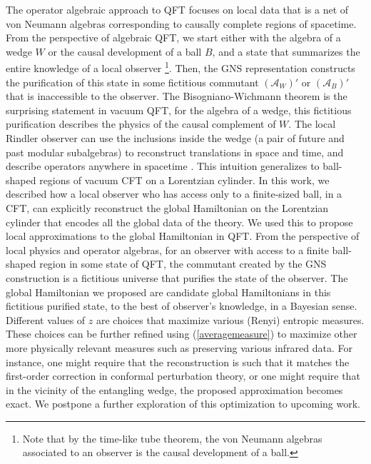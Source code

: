 \documentclass[a4paper,11pt]{article}
\theoremstyle{definition}
\newcommand{\mA}{\mathcal{A}}
\begin{document}
The operator algebraic approach to QFT focuses on local data that is a net of von Neumann algebras corresponding to causally complete regions of spacetime. From the perspective of algebraic QFT, we start either with the algebra of a wedge $W$ or the causal development of a ball $B$, and a state that summarizes the entire knowledge of a local observer \footnote{Note that by the time-like tube theorem, the von Neumann algebras associated to an observer is the causal development of a ball.}. Then, the GNS representation constructs the purification of this state in some fictitious commutant $(\mA_W)'$ or $(\mA_B)'$ that is inaccessible to the observer. The Bisogniano-Wichmann theorem is the surprising statement in vacuum QFT, for the algebra of a wedge, this fictitious purification describes the physics of the causal complement of $W$. The local Rindler observer can use the inclusions inside the wedge (a pair of future and past modular subalgebras) to reconstruct translations in space and time, and describe operators anywhere in spacetime \cite{revolutionizing}. This intuition generalizes to ball-shaped regions of vacuum CFT on a Lorentzian cylinder. In this work, we described how a local observer who has access only to a finite-sized ball, in a CFT, can explicitly reconstruct the global Hamiltonian on the Lorentzian cylinder that encodes all the global data of the theory. We used this to propose local approximations to the global Hamiltonian in QFT. From the perspective of local physics and operator algebras, for an observer with access to a finite ball-shaped region in some state of QFT, the commutant created by the GNS construction is a fictitious universe that purifies the state of the observer. The global Hamiltonian we proposed are candidate global Hamiltonians in this fictitious purified state, to the best of observer's knowledge, in a Bayesian sense. Different values of $z$ are choices that maximize various (Renyi) entropic measures. These choices can be further refined using (\ref{averagemeasure}) to maximize other more physically relevant measures such as preserving various infrared data. 
For instance, one might require that the reconstruction is such that it matches the first-order correction in conformal perturbation theory, or one might require that in the vicinity of the entangling wedge, the proposed approximation becomes exact. We postpone a further exploration of this optimization to upcoming work.
\end{document}

